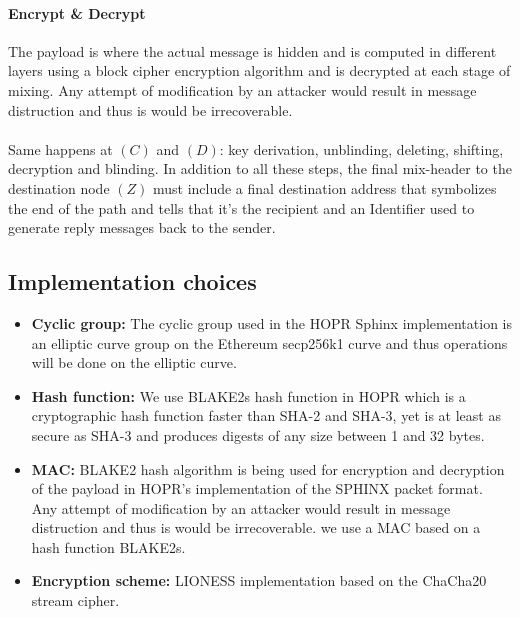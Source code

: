 \paragraph{Encrypt \& Decrypt}
The payload is where the actual message is hidden and is computed in different layers using a block cipher encryption algorithm and is decrypted at each stage of mixing. Any attempt of modification by an attacker would result in message distruction and thus is would be irrecoverable. 
\\~\\Same happens at $(C)$ and $(D)$: key derivation, unblinding, deleting, shifting, decryption and blinding. 
In addition to all these steps, the final mix-header to the destination node $(Z)$ must include a final destination address that symbolizes the end of the path and tells that it’s the recipient and an Identifier used to generate reply messages back to the sender.
\subsection*{Implementation choices}
\begin{itemize}
    \item \textbf{Cyclic group:} The cyclic group used in the HOPR Sphinx implementation is an elliptic curve group on the Ethereum secp256k1 curve and thus operations will be done on the elliptic curve.
    \item \textbf{Hash function:} We use BLAKE2s hash function in HOPR which is a cryptographic hash function faster than SHA-2 and SHA-3, yet is at least as secure as SHA-3 and produces digests of any size between 1 and 32 bytes.
    \item \textbf{MAC:} BLAKE2 hash algorithm is being used for encryption and decryption of the payload in HOPR's implementation of the SPHINX packet format. Any attempt of modification by an attacker would result in message distruction and thus is would be irrecoverable. we use a MAC based on a hash function BLAKE2s.
    \item \textbf{Encryption scheme:} LIONESS implementation based on the ChaCha20 stream cipher.
\end{itemize}





